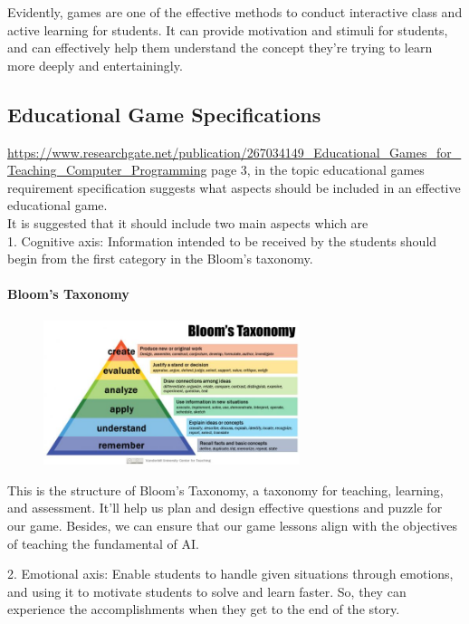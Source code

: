 Evidently, games are one of the effective methods to conduct interactive class and active learning for students. It can provide motivation and stimuli for students, and can effectively help them understand the concept they're trying to learn more deeply and entertainingly.


\subsection{Educational Game Specifications}
\url{https://www.researchgate.net/publication/267034149_Educational_Games_for_Teaching_Computer_Programming} page 3, in the topic educational games requirement specification suggests what aspects should be included in an effective educational game.\\
It is suggested that it should include two main aspects which are\\
1. Cognitive axis: Information intended to be received by the students should begin from the first category in the Bloom's taxonomy. 
\vspace{-5mm}
\paragraph{Bloom's Taxonomy} 

\begin{figure}
\includegraphics[width=7.5cm]{./assets/bloom.jpeg}
\end{figure} 
This is the structure of Bloom's Taxonomy, a taxonomy for teaching, learning, and assessment. It'll help us plan and design effective questions and puzzle for our game. Besides, we can ensure that our game lessons align with the objectives of teaching the fundamental of AI.
\\
\par
2. Emotional axis: Enable students to handle given situations through emotions, and using it to motivate students to solve and learn faster. So, they can experience the accomplishments when they get to the end of the story.